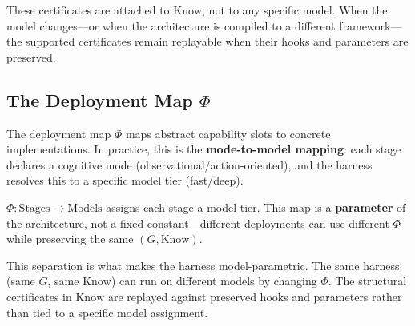 These certificates are attached to $\mathrm{Know}$, not to any specific model. When the model changes---or when the architecture is compiled to a different framework---the supported certificates remain replayable when their hooks and parameters are preserved.

\subsection{The Deployment Map $\Phi$}

The deployment map $\Phi$ maps abstract capability slots to concrete implementations. In practice, this is the \textbf{mode-to-model mapping}: each stage declares a cognitive mode (observational/action-oriented), and the harness resolves this to a specific model tier (fast/deep).

\begin{definition}
$\Phi: \mathrm{Stages} \to \mathrm{Models}$ assigns each stage a model tier. This map is a \textbf{parameter} of the architecture, not a fixed constant---different deployments can use different $\Phi$ while preserving the same $(G, \mathrm{Know})$.
\end{definition}

This separation is what makes the harness model-parametric. The same harness (same $G$, same $\mathrm{Know}$) can run on different models by changing $\Phi$. The structural certificates in $\mathrm{Know}$ are replayed against preserved hooks and parameters rather than tied to a specific model assignment.
